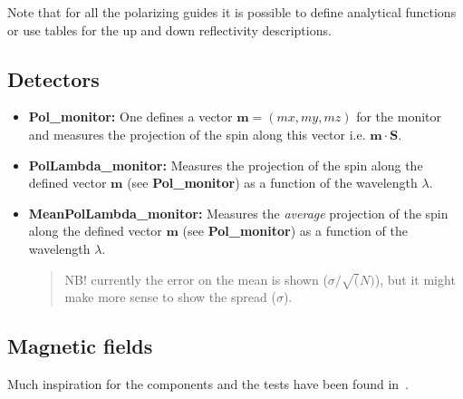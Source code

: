 Note that for all the polarizing guides it is possible to define analytical
functions or use tables for the up and down reflectivity descriptions.

\subsection{Detectors}

\begin{itemize}
\item \textbf{Pol\_monitor:} One defines a vector $\mathbf{m} = (mx,
  my, mz)$ for the monitor and measures the projection of the spin
  along this vector i.e. $\mathbf{m} \cdot \mathbf{S}$.\\

\item \textbf{PolLambda\_monitor:} Measures the projection of the
  spin along the defined vector $\mathbf{m}$ (see
  \textbf{Pol\_monitor}) as a function of the wavelength $\lambda$.

\item \textbf{MeanPolLambda\_monitor:} Measures the \emph{average}
  projection of the spin along the defined vector $\mathbf{m}$ (see
  \textbf{Pol\_monitor}) as a function of the wavelength $\lambda$.

  \begin{quote}
    NB! currently the error on the mean is shown ($\sigma/\sqrt(N)$), but it
    might make more sense to show the spread ($\sigma$).
  \end{quote}
\end{itemize}

\subsection{Magnetic fields}

Much inspiration for the components and the tests have been found
in~\cite{pol_seeger}.

